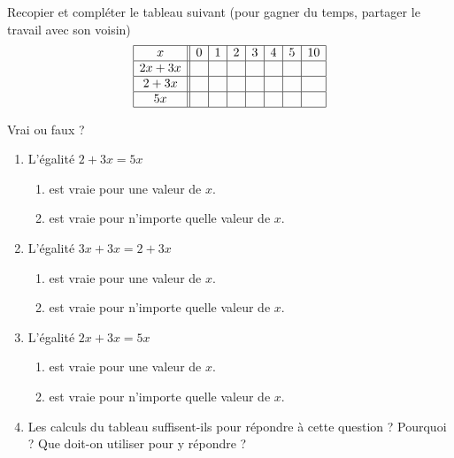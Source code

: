 
\begin{exercice}\label{exosmath-0781}

    Recopier et compléter le tableau suivant (pour gagner du temps, partager le travail avec son voisin)
    \begin{equation*}
        \begin{array}[]{|c||c|c|c|c|c|c|c|}
            \hline
            x&0&1&2&3&4&5&10\\
            \hline
            2x+3x&&&&&&&\\
            \hline
            2+3x&&&&&&&\\
            \hline
            5x&&&&&&&\\
            \hline
        \end{array}
    \end{equation*}

    Vrai ou faux ?

    \begin{enumerate}
        \item
            L'égalité \( 2+3x=5x\)
            \begin{enumerate}
                    
        \item
             est vraie pour une valeur de $x$.
         \item
            est vraie pour n'importe quelle valeur de $x$.
            \end{enumerate}
        \item
            L'égalité \( 3x+3x=2+3x\)
            \begin{enumerate}
                \item
 est vraie pour une valeur de $x$.
 \item
est vraie pour n'importe quelle valeur de $x$.
            \end{enumerate}
        \item
            L'égalité \( 2x+3x=5x\)
            \begin{enumerate}
                \item
                    
 est vraie pour une valeur de $x$.
 \item
     est vraie pour n'importe quelle valeur de $x$.          
     \end{enumerate}
        \item
Les calculs du tableau suffisent-ils pour répondre à cette question ? Pourquoi ?  Que doit-on utiliser pour y répondre ?
    \end{enumerate}

\end{exercice}

